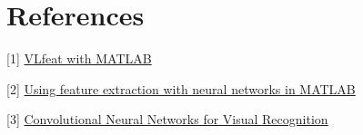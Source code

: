 \section{References}

[1] \href{http://www.vlfeat.org/matlab/matlab.html}{VLfeat with MATLAB}

[2] \href{https://uk.mathworks.com/videos/using-feature-extraction-with-neural-networks-in-matlab-1492009542601.html}{Using feature extraction with neural networks in MATLAB}

[3] \href{http://cs231n.github.io/convolutional-networks/#layers}{Convolutional Neural Networks for Visual Recognition}


